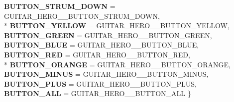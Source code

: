 \begin{DoxyCompactItemize}
{\bfseries B\-U\-T\-T\-O\-N\-\_\-\-S\-T\-R\-U\-M\-\_\-\-D\-O\-W\-N} =  G\-U\-I\-T\-A\-R\-\_\-\-H\-E\-R\-O\-\_\-\_\-\-B\-U\-T\-T\-O\-N\-\_\-\-S\-T\-R\-U\-M\-\_\-\-D\-O\-W\-N, 
\\*
{\bfseries B\-U\-T\-T\-O\-N\-\_\-\-Y\-E\-L\-L\-O\-W} =  G\-U\-I\-T\-A\-R\-\_\-\-H\-E\-R\-O\-\_\-\_\-\-B\-U\-T\-T\-O\-N\-\_\-\-Y\-E\-L\-L\-O\-W, 
{\bfseries B\-U\-T\-T\-O\-N\-\_\-\-G\-R\-E\-E\-N} =  G\-U\-I\-T\-A\-R\-\_\-\-H\-E\-R\-O\-\_\-\_\-\-B\-U\-T\-T\-O\-N\-\_\-\-G\-R\-E\-E\-N, 
{\bfseries B\-U\-T\-T\-O\-N\-\_\-\-B\-L\-U\-E} =  G\-U\-I\-T\-A\-R\-\_\-\-H\-E\-R\-O\-\_\-\_\-\-B\-U\-T\-T\-O\-N\-\_\-\-B\-L\-U\-E, 
{\bfseries B\-U\-T\-T\-O\-N\-\_\-\-R\-E\-D} =  G\-U\-I\-T\-A\-R\-\_\-\-H\-E\-R\-O\-\_\-\_\-\-B\-U\-T\-T\-O\-N\-\_\-\-R\-E\-D, 
\\*
{\bfseries B\-U\-T\-T\-O\-N\-\_\-\-O\-R\-A\-N\-G\-E} =  G\-U\-I\-T\-A\-R\-\_\-\-H\-E\-R\-O\-\_\-\_\-\-B\-U\-T\-T\-O\-N\-\_\-\-O\-R\-A\-N\-G\-E, 
{\bfseries B\-U\-T\-T\-O\-N\-\_\-\-M\-I\-N\-U\-S} =  G\-U\-I\-T\-A\-R\-\_\-\-H\-E\-R\-O\-\_\-\_\-\-B\-U\-T\-T\-O\-N\-\_\-\-M\-I\-N\-U\-S, 
{\bfseries B\-U\-T\-T\-O\-N\-\_\-\-P\-L\-U\-S} =  G\-U\-I\-T\-A\-R\-\_\-\-H\-E\-R\-O\-\_\-\_\-\-B\-U\-T\-T\-O\-N\-\_\-\-P\-L\-U\-S, 
{\bfseries B\-U\-T\-T\-O\-N\-\_\-\-A\-L\-L} =  G\-U\-I\-T\-A\-R\-\_\-\-H\-E\-R\-O\-\_\-\_\-\-B\-U\-T\-T\-O\-N\-\_\-\-A\-L\-L
 \}
\end{DoxyCompactItemize}
